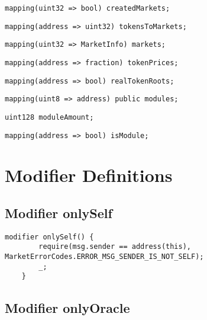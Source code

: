 \begin{lstlisting}[firstnumber=19]
    mapping(uint32 => bool) createdMarkets;
\end{lstlisting}

\begin{lstlisting}[firstnumber=20]
    mapping(address => uint32) tokensToMarkets;
\end{lstlisting}

\begin{lstlisting}[firstnumber=21]
    mapping(uint32 => MarketInfo) markets;
\end{lstlisting}

\begin{lstlisting}[firstnumber=22]
    mapping(address => fraction) tokenPrices;
\end{lstlisting}

\begin{lstlisting}[firstnumber=23]
    mapping(address => bool) realTokenRoots;
\end{lstlisting}

\begin{lstlisting}[firstnumber=25]
    mapping(uint8 => address) public modules;
\end{lstlisting}

\begin{lstlisting}[firstnumber=26]
    uint128 moduleAmount;
\end{lstlisting}

\begin{lstlisting}[firstnumber=27]
    mapping(address => bool) isModule;
\end{lstlisting}

\section{Modifier Definitions}


\subsection{Modifier onlySelf}


\begin{lstlisting}[firstnumber=510]
    modifier onlySelf() {
        require(msg.sender == address(this), MarketErrorCodes.ERROR_MSG_SENDER_IS_NOT_SELF);
        _;
    }
\end{lstlisting}

\subsection{Modifier onlyOracle}


